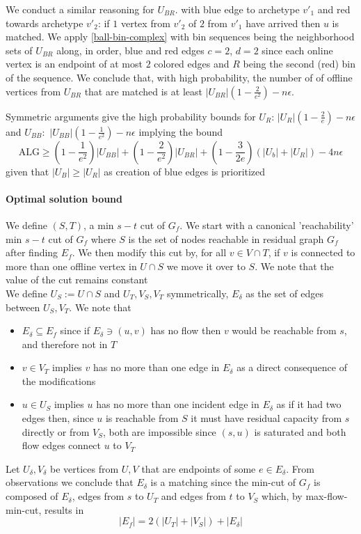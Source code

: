 We conduct a similar reasoning for $U_{BR}$. with blue edge to archetype $v'_1$ and red towards archetype $v'_2$: if $1$ vertex from $v'_2$ of $2$ from $v'_1$ have arrived then $u$ is matched. We apply \autoref{ball-bin-complex} with bin sequences being the neighborhood sets of $U_{BR}$ along, in order, blue and red edges $c=2$, $d=2$ since each online vertex is an endpoint of at most $2$ colored edges and $R$ being the second (red) bin of the sequence. We conclude that, with high probability, the number of of offline vertices from $U_{BR}$ that are matched is at least $|U_{BR}|(1-\frac{2}{e^2})-n \epsilon$.

Symmetric arguments give the high probability bounds for $U_R$: $|U_R|(1-\frac{2}{e})-n \epsilon$ and $U_{BB}:$ $|U_{BB}|(1-\frac{1}{e^2})-n \epsilon$ implying the bound
\begin{equation}
	\label{st-eq2}
	\mathrm{ALG}\geq (1-\frac{1}{e^2})|U_{BB}|+(1-\frac{2}{e^2})|U_{BR}|+(1-\frac{3}{2e})(|U_b|+|U_R|)-4n\epsilon
\end{equation}
given that $|U_B|\geq |U_R|$ as creation of blue edges is prioritized

\paragraph{Optimal solution bound}
We define $(S,T)$, a min $s-t$ cut of $G_f$. We start with a canonical 'reachability' min $s-t$ cut of $G_f$ where $S$ is the set of nodes reachable in residual graph $G_f$ after finding $E_f$. We then modify this cut by, for all $v\in V\cap T$, if $v$ is connected to more than one offline vertex in $U\cap S$ we move it over to $S$. We note that the value of the cut remains constant\\
We define $U_S:=U\cap S$ and $U_T,V_S,V_T$ symmetrically, $E_\delta$ as the set of edges between $U_S,V_T$.
We note that
\begin{itemize}
	\item $E_\delta\subseteq E_f$ since if $E_\delta\ni(u,v)$ has no flow then $v$ would be reachable from $s$, and therefore not in $T$
	\item $v\in V_T$ implies $v$ has no more than one edge in $E_\delta$ as a direct consequence of the modifications
	\item $u\in U_S$ implies $u$ has no more than one incident edge in $E_\delta$ as if it had two edges then, since $u$ is reachable from $S$ it must have residual capacity from $s$ directly or from $V_S$, both are impossible since $(s,u)$ is saturated and both flow edges connect $u$ to $V_T$
\end{itemize}
Let $U_\delta,V_\delta$ be vertices from $U,V$ that are endpoints of some $e\in E_\delta$. From observations we conclude that $E_\delta$ is a matching since the min-cut of $G_f$ is composed of $E_\delta$, edges from $s$ to $U_T$ and edges from $t$ to $V_S$ which, by max-flow-min-cut, results in\\
\begin{equation}
	\label{st-eq3}
	|E_f|=2(|U_T|+|V_S|)+|E_\delta|
\end{equation}


